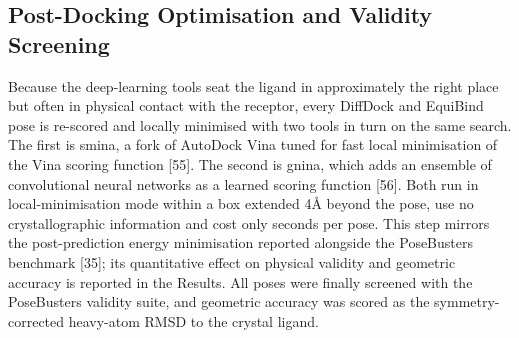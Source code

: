 \hypertarget{post-docking-optimisation-and-validity-screening}{%
\subsection{Post-Docking Optimisation and Validity Screening}\label{post-docking-optimisation-and-validity-screening}}

Because the deep-learning tools seat the ligand in approximately the right place but often in physical contact with the receptor, every DiffDock and EquiBind pose is re-scored and locally minimised with two tools in turn on the same search. The first is smina, a fork of AutoDock Vina tuned for fast local minimisation of the Vina scoring function {[}55{]}. The second is gnina, which adds an ensemble of convolutional neural networks as a learned scoring function {[}56{]}. Both run in local-minimisation mode within a box extended 4Å beyond the pose, use no crystallographic information and cost only seconds per pose. This step mirrors the post-prediction energy minimisation reported alongside the PoseBusters benchmark {[}35{]}; its quantitative effect on physical validity and geometric accuracy is reported in the Results. All poses were finally screened with the PoseBusters validity suite, and geometric accuracy was scored as the symmetry-corrected heavy-atom RMSD to the crystal ligand.

